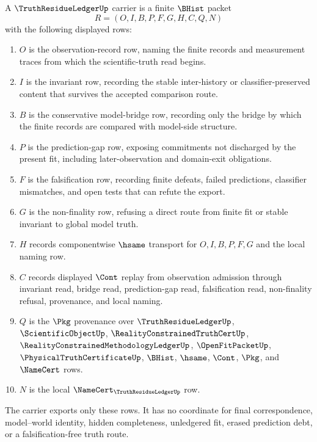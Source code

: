 \begin{definition}
\label{def:truth-residue-ledger-carrier}
A $\TruthResidueLedgerUp$ carrier is a finite $\BHist$ packet
$$
R=(O,I,B,P,F,G,H,C,Q,N)
$$
with the following displayed rows:
\begin{enumerate}
\item $O$ is the observation-record row, naming the finite records and measurement traces from which the scientific-truth read begins.
\item $I$ is the invariant row, recording the stable inter-history or classifier-preserved content that survives the accepted comparison route.
\item $B$ is the conservative model-bridge row, recording only the bridge by which the finite records are compared with model-side structure.
\item $P$ is the prediction-gap row, exposing commitments not discharged by the present fit, including later-observation and domain-exit obligations.
\item $F$ is the falsification row, recording finite defeats, failed predictions, classifier mismatches, and open tests that can refute the export.
\item $G$ is the non-finality row, refusing a direct route from finite fit or stable invariant to global model truth.
\item $H$ records componentwise $\hsame$ transport for $O,I,B,P,F,G$ and the local naming row.
\item $C$ records displayed $\Cont$ replay from observation admission through invariant read, bridge read, prediction-gap read, falsification read, non-finality refusal, provenance, and local naming.
\item $Q$ is the $\Pkg$ provenance over $\TruthResidueLedgerUp$, $\ScientificObjectUp$, $\RealityConstrainedTruthCertUp$, $\RealityConstrainedMethodologyLedgerUp$, $\OpenFitPacketUp$, $\PhysicalTruthCertificateUp$, $\BHist$, $\hsame$, $\Cont$, $\Pkg$, and $\NameCert$ rows.
\item $N$ is the local $\NameCert_{\TruthResidueLedgerUp}$ row.
\end{enumerate}
The carrier exports only these rows. It has no coordinate for final correspondence, model--world identity, hidden completeness, unledgered fit, erased prediction debt, or a falsification-free truth route.
\end{definition}

